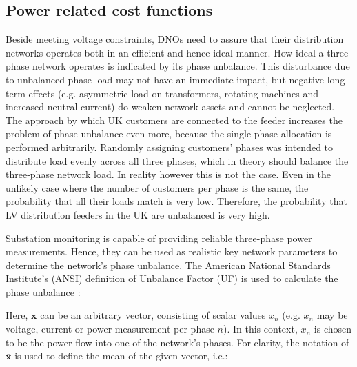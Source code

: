 \subsection{Power related cost functions}
\label{ch1:subsec:powers-related-cost-functions}

Beside meeting voltage constraints, DNOs need to assure that their distribution networks operates both in an efficient and hence ideal manner.
How ideal a three-phase network operates is indicated by its phase unbalance.
This disturbance due to unbalanced phase load may not have an immediate impact, but negative long term effects (e.g. asymmetric load on transformers, rotating machines and increased neutral current) do weaken network assets and cannot be neglected.
The approach by which UK customers are connected to the feeder increases the problem of phase unbalance even more, because the single phase allocation is performed arbitrarily.
Randomly assigning customers' phases was intended to distribute load evenly across all three phases, which in theory should balance the three-phase network load.
In reality however this is not the case.
Even in the unlikely case where the number of customers per phase is the same, the probability that all their loads match is very low.
Therefore, the probability that LV distribution feeders in the UK are unbalanced is very high.


Substation monitoring is capable of providing reliable three-phase power measurements.
Hence, they can be used as realistic key network parameters to determine the network's phase unbalance.
The American National Standards Institute's (ANSI) definition of Unbalance Factor (UF) is used to calculate the phase unbalance \cite{ANSI-MB-1-2011}:



Here, $\textbf{x}$ can be an arbitrary vector, consisting of scalar values $x_n$ (e.g. $x_n$ may be voltage, current or power measurement per phase $n$).
In this context, $x_n$ is chosen to be the power flow into one of the network's phases.
For clarity, the notation of $\overline{\textbf{x}}$ is used to define the mean of the given vector, i.e.:

